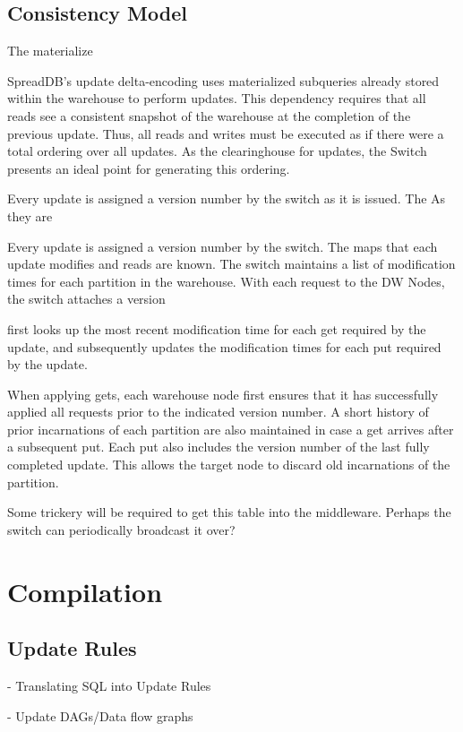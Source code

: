 \documentclass{sig-alternate}
\begin{document}
\subsection{Consistency Model}

The materialize

SpreadDB's update delta-encoding uses materialized subqueries already stored within the warehouse to perform updates.  This dependency requires that all reads see a consistent snapshot of the warehouse at the completion of the previous update.  Thus, all reads and writes must be executed as if there were a total ordering over all updates.  As the clearinghouse for updates, the Switch presents an ideal point for generating this ordering.  

Every update is assigned a version number by the switch as it is issued.  The 
As they are 

Every update is assigned a version number by the switch.  The maps that each update modifies and reads are known.  The switch maintains a list of modification times for each partition in the warehouse.  With each request to the DW Nodes, the switch attaches a version 

 first looks up the most recent modification time for each get required by the update, and subsequently updates the modification times for each put required by the update.  

When applying gets, each warehouse node first ensures that it has successfully applied all requests prior to the indicated version number.  A short history of prior incarnations of each partition are also maintained in case a get arrives after a subsequent put.  Each put also includes the version number of the last fully completed update.  This allows the target node to discard old incarnations of the partition.

Some trickery will be required to get this table into the middleware.  Perhaps the switch can periodically broadcast it over?

\section{Compilation}
\label{sec:compilation}

\subsection{Update Rules}
- Translating SQL into Update Rules

- Update DAGs/Data flow graphs
\end{document}
